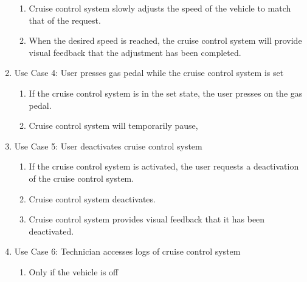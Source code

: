 \documentclass[preprint,11pt,3p]{article}
\begin{document}
\begin{enumerate}
\begin{enumerate}
			\item Cruise control system slowly adjusts the speed of the vehicle to match that of the request.
			\item When the desired speed is reached, the cruise control system will provide visual feedback that the adjustment has been completed.
		\end{enumerate}
	\item Use Case 4: User presses gas pedal while the cruise control system is set
		\begin{enumerate}
			\item If the cruise control system is in the set state, the user presses on the gas pedal.
			\item Cruise control system will temporarily pause, 
		\end{enumerate}
	\item Use Case 5: User deactivates cruise control system
		\begin{enumerate}
			\item If the cruise control system is activated, the user requests a deactivation of the cruise control system.
			\item Cruise control system deactivates.
			\item Cruise control system provides visual feedback that it has been deactivated.
		\end{enumerate}
	\item Use Case 6: Technician accesses logs of cruise control system
		\begin{enumerate}
			\item Only if the vehicle is off 
		\end{enumerate}
\end{enumerate}
\end{document}
